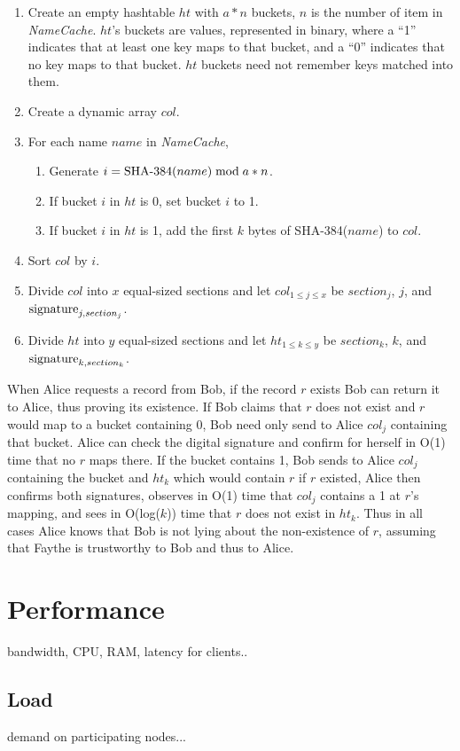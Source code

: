 \begin{enumerate}
	\item Create an empty hashtable $ ht $ with $ a * n $ buckets, $ n $ is the number of item in \emph{NameCache}. $ ht $'s buckets are values, represented in binary, where a ``1'' indicates that at least one key maps to that bucket, and a ``0'' indicates that no key maps to that bucket. $ ht $ buckets need not remember keys matched into them.
	\item Create a dynamic array $ col $.
	\item For each name $ name $ in \emph{NameCache},
	\begin{enumerate}
		\item Generate $ i = \textnormal{SHA-384}(name) \bmod a * n $.
		\item If bucket $ i $ in $ ht $ is 0, set bucket $ i $ to 1.
		\item If bucket $ i $ in $ ht $ is 1, add the first $ k $ bytes of \textnormal{SHA-384}($ name $) to $ col $.
	\end{enumerate}
	\item Sort $ col $ by $ i $.
	\item Divide $ col $ into $ x $ equal-sized sections and let $ col_{ 1 \le j \le x } $ be $ section_{j} $, $ j $, and $ \textnormal{signature}_{j, section_{j}} $.
	\item Divide $ ht $ into $ y $ equal-sized sections and let $ ht_{ 1 \le k \le y } $ be $ section_{k} $, $ k $, and $ \textnormal{signature}_{k, section_{k}} $.
\end{enumerate}

When Alice requests a record from Bob, if the record $ r $ exists Bob can return it to Alice, thus proving its existence. If Bob claims that $ r $ does not exist and $ r $ would map to a bucket containing 0, Bob need only send to Alice $ col_{j} $ containing that bucket. Alice can check the digital signature and confirm for herself in O(1) time that no $ r $ maps there. If the bucket contains 1, Bob sends to Alice $ col_{j} $ containing the bucket and $ ht_{k} $ which would contain $ r $ if $ r $ existed, Alice then confirms both signatures, observes in O(1) time that $ col_{j} $ contains a 1 at $ r $'s mapping, and sees in O(log($ k $)) time that $ r $ does not exist in $ ht_{k} $. Thus in all cases Alice knows that Bob is not lying about the non-existence of $ r $, assuming that Faythe is trustworthy to Bob and thus to Alice.


\section{Performance}

bandwidth, CPU, RAM, latency for clients..

\subsection{Load}

demand on participating nodes...

